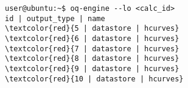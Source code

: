 \begin{Verbatim}[frame=single, commandchars=\\\{\}, fontsize=\small]
user@ubuntu:~$ oq-engine --lo <calc_id>
id | output_type | name
\textcolor{red}{5 | datastore | hcurves}
\textcolor{red}{6 | datastore | hcurves}
\textcolor{red}{7 | datastore | hcurves}
\textcolor{red}{8 | datastore | hcurves}
\textcolor{red}{9 | datastore | hcurves}
\textcolor{red}{10 | datastore | hcurves}
\end{Verbatim}